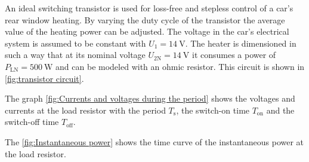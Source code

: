 

An ideal switching transistor is used for loss-free and stepless control of a car's rear window heating.
By varying the duty cycle of the transistor the average value of the heating power can be adjusted. The voltage in the car's electrical system is assumed to be constant with $U_1 = \SI{14}{\volt}$. The heater is dimensioned in such a way
that at its nominal voltage $ U_{\mathrm{2N}} = \SI{14}{\volt}$ it consumes a power of $ P_{\mathrm{LN}} = \SI{500}{\watt}$ and
can be modeled with an ohmic resistor. This circuit is shown in \autoref{fig:transistor circuit}.

%
\begin{solutionblock}
The graph \autoref{fig:Currents and voltages during the period} shows the voltages and currents at the load resistor with the period $T_{\mathrm{s}}$, the switch-on time $T_{\mathrm{on}}$ and the switch-off time $T_{\mathrm{off}}$. 


            
\end{solutionblock}



\begin{solutionblock}
The \autoref{fig:Instantaneous power} shows the time curve of the instantaneous power at the load resistor.



\end{solutionblock}


